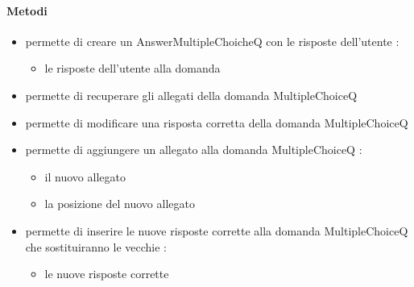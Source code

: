 \paragraph{Metodi}
\begin{itemize}
\item {}
\newline
permette di creare un AnswerMultipleChoicheQ con le risposte dell'utente
\newline
{} :
\begin{itemize}
\item {}
\newline
le risposte dell'utente alla domanda
\end{itemize}
\item {}
\newline
permette di recuperare gli allegati della domanda MultipleChoiceQ
\newline
\item {}
\newline
permette di modificare una risposta corretta della domanda MultipleChoiceQ
\newline
\item {}
\newline
permette di aggiungere un allegato alla domanda MultipleChoiceQ
\newline
{} :
\begin{itemize}
\item {}
\newline
il nuovo allegato
\item {}
\newline
la posizione del nuovo allegato
\end{itemize}
\item {}
\newline
permette di inserire le nuove risposte corrette alla domanda MultipleChoiceQ che sostituiranno le vecchie
\newline
{} :
\begin{itemize}
\item {}
\newline
le nuove risposte corrette
\end{itemize}
\end{itemize}
